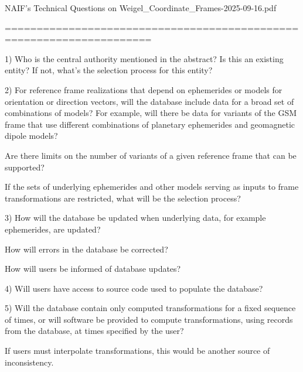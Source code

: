 NAIF's Technical Questions on Weigel_Coordinate_Frames-2025-09-16.pdf

=====================================================================

 

 

1)  Who is the central authority mentioned in the abstract? Is this an existing entity? If not, what's the selection process for this entity?

 

 

2) For reference frame realizations that depend on ephemerides or models for orientation or direction vectors, will the database include data for a broad set of combinations of models? For example, will there be data for variants of the GSM frame that use different combinations of planetary ephemerides and geomagnetic dipole models?

 

Are there limits on the number of variants of a given reference frame that can be supported?

 

If the sets of underlying ephemerides and other models serving as inputs to frame transformations are restricted, what will be the selection process?

 

 

3) How will the database be updated when underlying data, for example ephemerides, are updated?

 

How will errors in the database be corrected? 

 

How will users be informed of database updates?

 

 

4) Will users have access to source code used to populate the database?

 

 

5) Will the database contain only computed transformations for a fixed sequence of times, or will software be provided to compute transformations, using records from the database, at times specified by the user?

 

If users must interpolate transformations, this would be another source of inconsistency.

 

